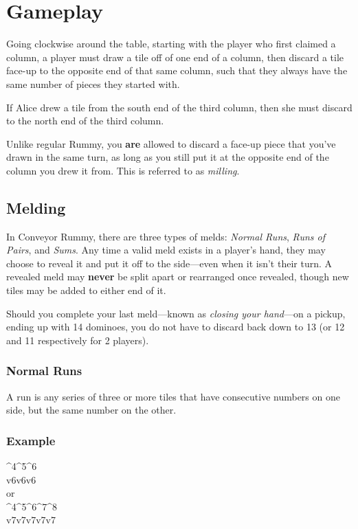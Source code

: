 \section{Gameplay}
Going clockwise around the table, starting with the player who first claimed a column, a player must draw a tile off of one end of a column, then discard a tile face-up to the opposite end of that same column, such that they always have the same number of pieces they started with.

\example If Alice drew a tile from the south end of the third column, then she must discard to the north end of the third column.

\note Unlike regular Rummy, you \textbf{are} allowed to discard a face-up piece that you've drawn in the same turn, as long as you still put it at the opposite end of the column you drew it from. This is referred to as \textit{milling}.

\subsection{Melding}\label{sec:melding}
In Conveyor Rummy, there are three types of melds: \textit{Normal Runs}, \textit{Runs of Pairs}, and \textit{Sums}.
Any time a valid meld exists in a player's hand, they may choose to reveal it and put it off to the side---even when it isn't their turn.
A revealed meld may \textbf{never} be split apart or rearranged once revealed, though new tiles may be added to either end of it.

Should you complete your last meld---known as \textit{closing your hand}---on a pickup, ending up with 14 dominoes, you do not have to discard back down to 13 (or 12 and 11 respectively for 2 players).

\subsubsection{Normal Runs}
A run is any series of three or more tiles that have consecutive numbers on one side, but the same number on the other.

\subsubsection*{Example}
{\domino ^4^5^6\\v6v6v6}\vspace{1mm}\\
\vspace{1mm}or\\
{\domino ^4^5^6^7^8\\v7v7v7v7v7}

